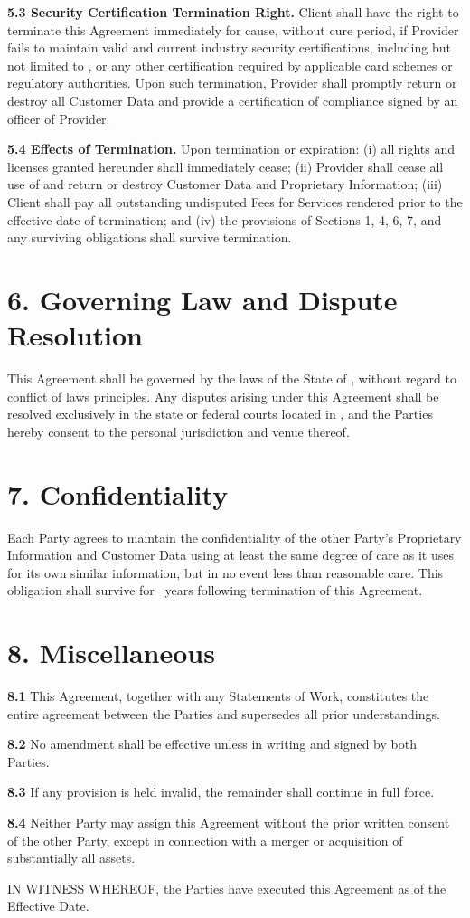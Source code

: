 \documentclass[11pt]{article}
\begin{document}
\textbf{5.3 Security Certification Termination Right.} Client shall have the right to
terminate this Agreement immediately for cause, without cure period, if Provider fails to
maintain valid and current industry security certifications, including but not limited to
\RequiredCertifications, or any other certification required by applicable card schemes or
regulatory authorities. Upon such termination, Provider shall promptly return or destroy all
Customer Data and provide a certification of compliance signed by an officer of Provider.

\textbf{5.4 Effects of Termination.} Upon termination or expiration: (i) all rights and
licenses granted hereunder shall immediately cease; (ii) Provider shall cease all use of and
return or destroy Customer Data and Proprietary Information; (iii) Client shall pay all
outstanding undisputed Fees for Services rendered prior to the effective date of
termination; and (iv) the provisions of Sections 1, 4, 6, 7, and any surviving obligations
shall survive termination.

\section*{6. Governing Law and Dispute Resolution}
This Agreement shall be governed by the laws of the State of \GoverningLawState, without
regard to conflict of laws principles. Any disputes arising under this Agreement shall be
resolved exclusively in the state or federal courts located in \VenueCounty, and the Parties
hereby consent to the personal jurisdiction and venue thereof.

\section*{7. Confidentiality}
Each Party agrees to maintain the confidentiality of the other Party's Proprietary
Information and Customer Data using at least the same degree of care as it uses for its own
similar information, but in no event less than reasonable care. This obligation shall
survive for \ConfidentialitySurvivalYears\ years following termination of this Agreement.

\section*{8. Miscellaneous}
\textbf{8.1} This Agreement, together with any Statements of Work, constitutes the entire
agreement between the Parties and supersedes all prior understandings.

\textbf{8.2} No amendment shall be effective unless in writing and signed by both Parties.

\textbf{8.3} If any provision is held invalid, the remainder shall continue in full force.

\textbf{8.4} Neither Party may assign this Agreement without the prior written consent of
the other Party, except in connection with a merger or acquisition of substantially all
assets.

IN WITNESS WHEREOF, the Parties have executed this Agreement as of the Effective Date.

\end{document}

